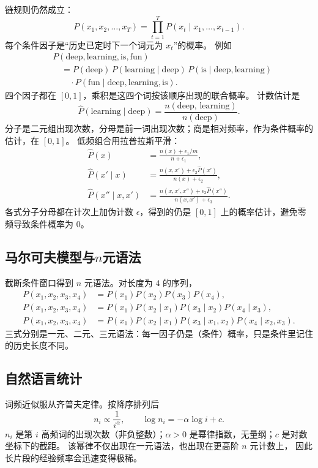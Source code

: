 链规则仍然成立：
\[
P(x_1,x_2,\ldots,x_T)
=
\prod_{t=1}^{T}P(x_t \mid x_1,\ldots,x_{t-1}).
\]
每个条件因子是“历史已定时下一个词元为 $x_t$”的概率。
例如
\begin{align*}
&P(\text{deep},\text{learning},\text{is},\text{fun})
\\
&\quad=
P(\text{deep})\,
P(\text{learning}\mid\text{deep})\,
P(\text{is}\mid\text{deep},\text{learning})
\\
&\qquad\cdot
P(\text{fun}\mid\text{deep},\text{learning},\text{is}).
\end{align*}
四个因子都在 $[0,1]$，乘积是这四个词按该顺序出现的联合概率。
计数估计是
\[
\hat{P}(\text{learning}\mid\text{deep})
=
\frac{n(\text{deep, learning})}{n(\text{deep})}.
\]
分子是二元组出现次数，分母是前一词出现次数；商是相对频率，作为条件概率的估计，在 $[0,1]$。
低频组合用拉普拉斯平滑：
\begin{align*}
\hat{P}(x)
&=
\frac{n(x)+\epsilon_1/m}{n+\epsilon_1},
\\
\hat{P}(x'\mid x)
&=
\frac{n(x,x')+\epsilon_2\hat{P}(x')}{n(x)+\epsilon_2},
\\
\hat{P}(x''\mid x,x')
&=
\frac{n(x,x',x'')+\epsilon_3\hat{P}(x'')}{n(x,x')+\epsilon_3}.
\end{align*}
各式分子分母都在计次上加伪计数 $\epsilon$，得到的仍是 $[0,1]$ 上的概率估计，避免零频导致条件概率为 $0$。

\subsection{\texorpdfstring{马尔可夫模型与$n$元语法}{马尔可夫模型与n元语法}}

截断条件窗口得到 $n$ 元语法。对长度为 $4$ 的序列，
\begin{align*}
P(x_1,x_2,x_3,x_4)
&=
P(x_1)P(x_2)P(x_3)P(x_4),
\\
P(x_1,x_2,x_3,x_4)
&=
P(x_1)P(x_2\mid x_1)P(x_3\mid x_2)P(x_4\mid x_3),
\\
P(x_1,x_2,x_3,x_4)
&=
P(x_1)P(x_2\mid x_1)P(x_3\mid x_1,x_2)P(x_4\mid x_2,x_3).
\end{align*}
三式分别是一元、二元、三元语法：每一因子仍是（条件）概率，只是条件里记住的历史长度不同。

\subsection{自然语言统计}

词频近似服从齐普夫定律。按降序排列后
\[
n_i \propto \frac{1}{i^{\alpha}},
\qquad
\log n_i = -\alpha\log i + c.
\]
$n_i$ 是第 $i$ 高频词的出现次数（非负整数）；$\alpha>0$ 是幂律指数，无量纲；$c$ 是对数坐标下的截距。
该幂律不仅出现在一元语法，也出现在更高阶 $n$ 元计数上，
因此长片段的经验频率会迅速变得极稀。

